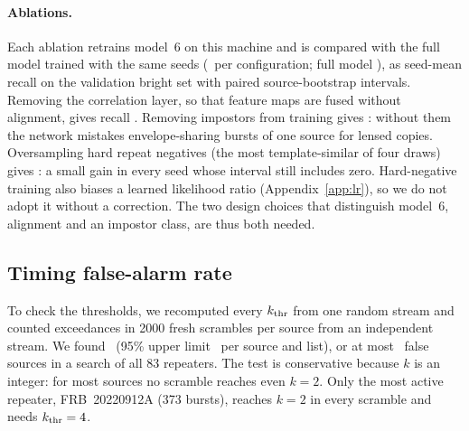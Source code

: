 \documentclass[fleqn,usenatbib]{mnras}
\begin{document}
\paragraph*{Ablations.}
Each ablation retrains model~6 on this machine and is compared with the full model trained with the same seeds
(\AblSeeds\ per configuration; full model \AblFull), as seed-mean recall on the validation bright set with paired
source-bootstrap intervals.
Removing the correlation layer, so that feature maps are fused without alignment, gives recall \AblNoalign.
Removing impostors from training gives \AblNoimp: without them the network mistakes envelope-sharing bursts of one source
for lensed copies. Oversampling hard repeat negatives (the most template-similar of four draws) gives \AblHardneg:
a small gain in every seed whose interval still includes zero. Hard-negative training also biases a learned likelihood
ratio (Appendix~\ref{app:lr}), so we do not adopt it without a correction.
The two design choices that distinguish model~6, alignment and an impostor class, are thus both needed.

\subsection{Timing false-alarm rate}
To check the thresholds, we recomputed every $k_{\rm thr}$ from one random stream and counted exceedances in 2000 fresh
scrambles per source from an independent stream. We found \FarHeldOut\ (95\% upper limit \FarRateUp\ per source and list),
or at most \FarSearchUp\ false sources in a search of all 83 repeaters. The test is conservative because $k$ is an integer:
for most sources no scramble reaches even $k=2$. Only the most active repeater, FRB~20220912A (373 bursts), reaches $k=2$ in
every scramble and needs $k_{\rm thr}=4$.
\end{document}

